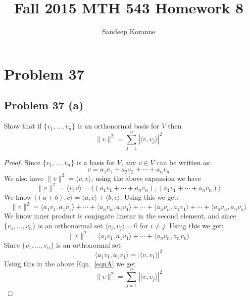 \documentclass{article}[10pt]
\begin{document}
\title{Fall 2015 MTH 543 Homework 8}
\author{Sandeep Koranne}
\maketitle

\section{Problem 37}
\subsection{Problem 37 (a)}
Show that if $\{v_1,\ldots,v_n\}$ is an
orthonormal basis for $V$ then
\[
\|v\|^2 = \sum_{j=1}^n |\langle v,v_j \rangle|^2
\]
\begin{proof}
Since $\{v_1,\ldots,v_n\}$ is a basis for $V$, any $v\in V$ can be
written as:
\[
v = a_1v_1 + a_2v_2 + \cdots + a_nv_n
\]
We also have $\|v\|^2=\langle v,v \rangle$, using the above
expansion we have
\[
\|v\|^2 = \langle v,v \rangle = \langle (a_1v_1 + \cdots + a_nv_n), (a_1v_1 + \cdots + a_nv_n) \rangle
\]
We know $\langle (a+b),c \rangle = \langle a,c \rangle + \langle b,c \rangle$.
Using this we get:
\[
\|v\|^2 = \langle a_1v_1,a_1v_1 \rangle +\cdots+ \langle a_nv_n,a_1v_1 \rangle + 
          \cdots +
          \langle a_nv_n,  a_1v_1 \rangle +\cdots+ \langle a_nv_n,a_nv_n \rangle
\]
We know inner product is conjugate linerar in the second element, and 
since $\{v_1,\ldots,v_n\}$ is an orthonormal set $\langle v_i,v_j \rangle = 0$ 
for $i \ne j$. Using this we get:
\begin{equation}
\|v\|^2 = \langle a_1v_1, a_1v_1 \rangle + \cdots + \langle a_nv_n, a_nv_n \rangle
\label{eqnA}
\end{equation}
Since $\{v_1,\ldots,v_n\}$ is an orthonormal set
\[
\langle a_1v_1,a_1v_1 \rangle = |\langle v, v_1\rangle|^2
\]
Using this in the above Eqn.~\ref{eqnA} we get
\[
\|v\|^2 = \sum_{j=1}^n |\langle v,v_j \rangle|^2
\]

\end{proof}
\end{document}
